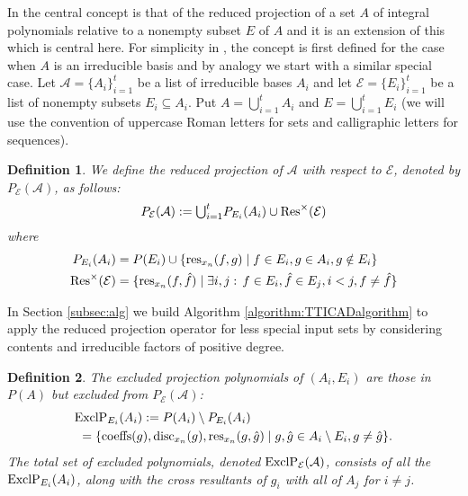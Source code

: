 \documentclass{article}
\newtheorem{definition}{Definition}
\begin{document}
In \cite{McCallum1999a} the central concept is that of the reduced projection
of a set $A$ of integral polynomials relative to a nonempty subset $E$ of $A$ and it is an extension of this which is central here.
For simplicity in \cite{McCallum1999a}, the concept is first defined for the case when $A$ is an irreducible basis and by analogy we start with a similar special case.
Let $\mathcal{A} = \{ A_i\}_{i=1}^t$ be a list of irreducible bases $A_i$
and let $\mathcal{E} = \{ E_i \}_{i=1}^t$ be a list of nonempty subsets
$E_i \subseteq A_i$. 
Put $A = \bigcup_{i=1}^t A_i$ and $E = \bigcup_{i=1}^t E_i$  (we will use the convention of uppercase Roman letters for sets and calligraphic letters for sequences). 
\begin{definition}\label{def:reducedproj}
We define the {\em reduced projection of $\mathcal{A}$ with respect to $\mathcal{E}$}, denoted by $P_{\mathcal{E}}(\mathcal{A})$, as follows:
\begin{equation}
P_{\mathcal{E}}(\mathcal{A}) := \textstyle{\bigcup_{i=1}^t} P_{E_i}(A_i) \cup {\rm Res}^{\times} (\mathcal{E}) \label{eqn:reducedproj}
\end{equation}
where 
\begin{align*}
P_{E_i}(A_i) &= P(E_i) \cup \left\{ {\rm res}_{x_n}(f,g) 
\mid f \in E_i, g \in A_i, g \notin E_i \right\}
\\
{\rm Res}^{\times} (\mathcal{E}) 
&= \{ {\rm res}_{x_n}(f,\hat{f}) \mid \exists i,j :
\, f \in E_i, \hat{f} \in E_j, i<j, f \neq \hat{f}  \}
\end{align*}
\end{definition}
In Section \ref{subsec:alg} we build Algorithm \ref{algorithm:TTICADalgorithm} to apply the reduced projection operator for less special input sets by considering contents and irreducible factors of positive degree.


\begin{definition}\label{def:excproj}
The {\em excluded projection polynomials} of $(A_i,E_i)$ 
are those in $P(A)$ but excluded from $P_{\mathcal{E}}(\mathcal{A})$:
\begin{align}
&{\rm ExclP}_{E_i}(A_i) := P(A_i) \setminus P_{E_i}(A_i) \label{eqn:exclprojeqn}\\
& \,\, = \{ {\rm coeffs}(g), {\rm disc}_{x_n}(g), {\rm res}_{x_n}(g,\hat{g}) \mid g, \hat{g} \in A_i \setminus E_i,  g \neq \hat{g} \}.\nonumber
\end{align}
The total set of excluded polynomials, denoted ${\rm ExclP}_{\mathcal{E}}(\mathcal{A})$, consists of all the ${\rm ExclP}_{E_i}(A_i)$, along with the cross resultants of $g_i$ with all of $A_j$ for $i \neq j$. 
\end{definition}
\end{document}
